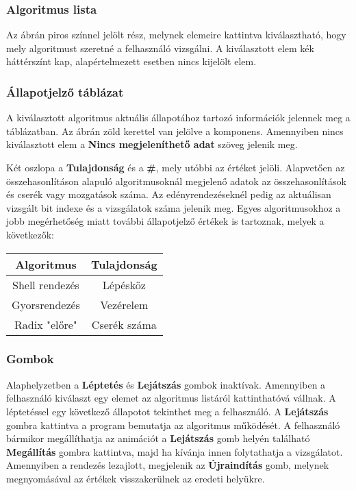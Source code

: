 \documentclass{elteikthesis}
\begin{document}
\subsubsection{Algoritmus lista}
Az ábrán piros színnel jelölt rész, melynek elemeire kattintva kiválasztható, hogy mely algoritmust szeretné a felhasználó vizsgálni. A kiválasztott elem kék háttérszínt kap, alapértelmezett esetben nincs kijelölt elem.
\subsubsection{Állapotjelző táblázat}
A kiválasztott algoritmus aktuális állapotához tartozó információk jelennek meg a táblázatban. Az ábrán zöld kerettel van jelölve a komponens. Amennyiben nincs kiválasztott elem a \textbf{Nincs megjeleníthető adat} szöveg jelenik meg.\par
Két oszlopa a \textbf{Tulajdonság} és a \textbf{\#}, mely utóbbi az értéket jelöli. Alapvetően az összehasonlításon alapuló algoritmusoknál megjelenő adatok az összehasonlítások és cserék vagy mozgatások száma. Az edényrendezéseknél pedig az aktuálisan vizsgált bit indexe és a vizsgálatok száma jelenik meg. Egyes algoritmusokhoz a jobb megérhetőség miatt további állapotjelző értékek is tartoznak, melyek a következők:
\begin{table}[h]
	\centering
	\begin{tabular}{|c|c|}
		\hline
		\textbf{Algoritmus} & \textbf{Tulajdonság} \\ \hline
		Shell rendezés      & Lépésköz             \\ \hline
		Gyorsrendezés       & Vezérelem            \\ \hline
		Radix "előre"       & Cserék száma         \\ \hline
	\end{tabular}
\end{table}
\subsubsection{Gombok}
Alaphelyzetben a \textbf{Léptetés} és \textbf{Lejátszás} gombok inaktívak. Amennyiben a felhasználó kiválaszt egy elemet az algoritmus listáról kattinthatóvá vállnak. A léptetéssel egy következő állapotot tekinthet meg a felhasználó. A \textbf{Lejátszás} gombra kattintva a program bemutatja az algoritmus működését. A felhasználó bármikor megállíthatja az animációt a \textbf{Lejátszás} gomb helyén található \textbf{Megállítás} gombra kattintva, majd ha kívánja innen folytathatja a vizsgálatot. Amennyiben a rendezés lezajlott, megjelenik az \textbf{Újraindítás} gomb, melynek megnyomásával az értékek visszakerülnek az eredeti helyükre.
\end{document}
